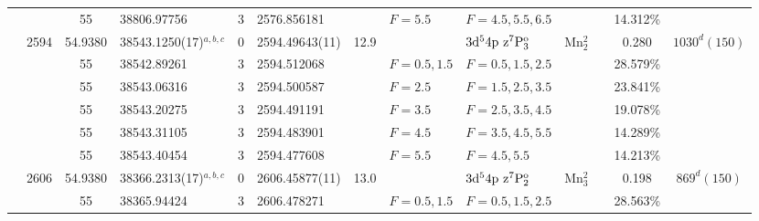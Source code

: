 \begin{table*}
\begin{center}
{\begin{tabular}{:l;l;c;l;c;l;c;l;l;c;c;c;c}
\rowstyle{\itshape}               &        & 55        & 38806.97756$^{}$                 & 3 &   2576.856181      &      & $F=5.5                                   $ & $F=4.5,5.5,6.5                           $ &             &              & 14.312\%  & $     ^{}     $\\
                                  & 2594   & 54.9380   & 38543.1250(17)$^{a,b,c}$         & 0 &    2594.49643(11)  & 12.9 & $                                        $ & $3\rm{d}^54\rm{p~z}^7\rm{P}_3^{\rm o}    $ & Mn$^2_{2}$  &              & 0.280     & $ 1030^{d}(150)$\\
\rowstyle{\itshape}               &        & 55        & 38542.89261$^{}$                 & 3 &   2594.512068      &      & $F=0.5,1.5                               $ & $F=0.5,1.5,2.5                           $ &             &              & 28.579\%  & $     ^{}     $\\
\rowstyle{\itshape}               &        & 55        & 38543.06316$^{}$                 & 3 &   2594.500587      &      & $F=2.5                                   $ & $F=1.5,2.5,3.5                           $ &             &              & 23.841\%  & $     ^{}     $\\
\rowstyle{\itshape}               &        & 55        & 38543.20275$^{}$                 & 3 &   2594.491191      &      & $F=3.5                                   $ & $F=2.5,3.5,4.5                           $ &             &              & 19.078\%  & $     ^{}     $\\
\rowstyle{\itshape}               &        & 55        & 38543.31105$^{}$                 & 3 &   2594.483901      &      & $F=4.5                                   $ & $F=3.5,4.5,5.5                           $ &             &              & 14.289\%  & $     ^{}     $\\
\rowstyle{\itshape}               &        & 55        & 38543.40454$^{}$                 & 3 &   2594.477608      &      & $F=5.5                                   $ & $F=4.5,5.5                               $ &             &              & 14.213\%  & $     ^{}     $\\
                                  & 2606   & 54.9380   & 38366.2313(17)$^{a,b,c}$         & 0 &    2606.45877(11)  & 13.0 & $                                        $ & $3\rm{d}^54\rm{p~z}^7\rm{P}_2^{\rm o}    $ & Mn$^2_{3}$  &              & 0.198     & $  869^{d}(150)$\\
\rowstyle{\itshape}               &        & 55        & 38365.94424$^{}$                 & 3 &   2606.478271      &      & $F=0.5,1.5                               $ & $F=0.5,1.5,2.5                           $ &             &              & 28.563\%  & $     ^{}     $\\

\end{tabular}}
\end{center}
\end{table*}
